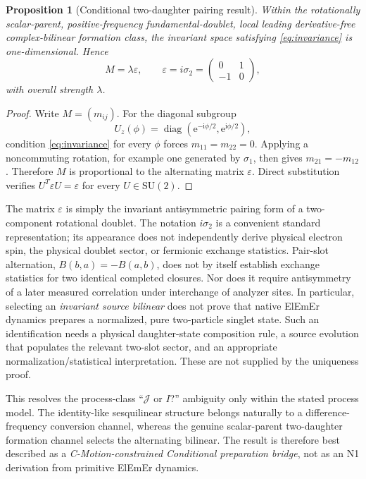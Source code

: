 \documentclass[11pt]{article}
\newtheorem{proposition}[theorem]{Proposition}
\theoremstyle{remark}
\newcommand{\cmotion}{\mbox{C-Motion}}
\newcommand{\ElEmEr}{\mbox{ElEmEr}}
\newcommand{\ii}{\mathrm{i}}
\newcommand{\ee}{\mathrm{e}}
\newcommand{\SU}{\mathrm{SU}(2)}
\newcommand{\epsm}{\varepsilon}
\begin{document}
\begin{proposition}[Conditional two-daughter pairing result]
Within the rotationally scalar-parent, positive-frequency fundamental-doublet, local leading
derivative-free complex-bilinear formation class, the invariant space satisfying
\eqref{eq:invariance} is one-dimensional.  Hence
\begin{equation}
  \boxed{
  M=\lambda\epsm,
  \qquad
  \epsm=i\sigma_2=
  \begin{pmatrix}
  0&1\\[-1mm]
  -1&0
  \end{pmatrix},}
  \label{eq:epsilon}
\end{equation}
with overall strength \(\lambda\).
\end{proposition}

\begin{proof}
Write \(M=(m_{ij})\).  For the diagonal subgroup
\[
  U_z(\phi)=\operatorname{diag}
  \!\left(\ee^{-\ii\phi/2},\ee^{\ii\phi/2}\right),
\]
condition \eqref{eq:invariance} for every \(\phi\) forces \(m_{11}=m_{22}=0\).  Applying a
noncommuting rotation, for example one generated by \(\sigma_1\), then gives
\(m_{21}=-m_{12}\).  Therefore \(M\) is proportional to the alternating matrix \(\epsm\).  Direct
substitution verifies \(U^T\epsm U=\epsm\) for every \(U\in\SU\).
\end{proof}

The matrix \(\epsm\) is simply the invariant antisymmetric pairing form of a two-component rotational
doublet.  The notation \(i\sigma_2\) is a convenient standard representation; its appearance does
not independently derive physical electron spin, the physical doublet sector, or fermionic exchange
statistics.  Pair-slot alternation, \(B(b,a)=-B(a,b)\), does not
by itself establish exchange statistics for two identical completed closures.
Nor does it require antisymmetry of a later measured correlation under
interchange of analyzer sites.  In particular, selecting an
\emph{invariant source bilinear} does not prove that
native \ElEmEr{} dynamics prepares a normalized, pure two-particle singlet state.  Such an
identification needs a physical daughter-state composition rule, a source evolution that
populates the relevant two-slot sector, and an appropriate normalization/statistical
interpretation.  These are not supplied by the uniqueness proof.

This resolves the process-class ``\(\mathcal J\) or \(I\)?'' ambiguity only within the stated process
model.  The identity-like sesquilinear structure belongs naturally to a difference-frequency
conversion channel, whereas the genuine scalar-parent two-daughter formation channel selects the
alternating bilinear.  The result is therefore best described as a \emph{\cmotion{}-constrained
Conditional preparation bridge}, not as an N1 derivation from primitive \ElEmEr{} dynamics.
\end{document}

